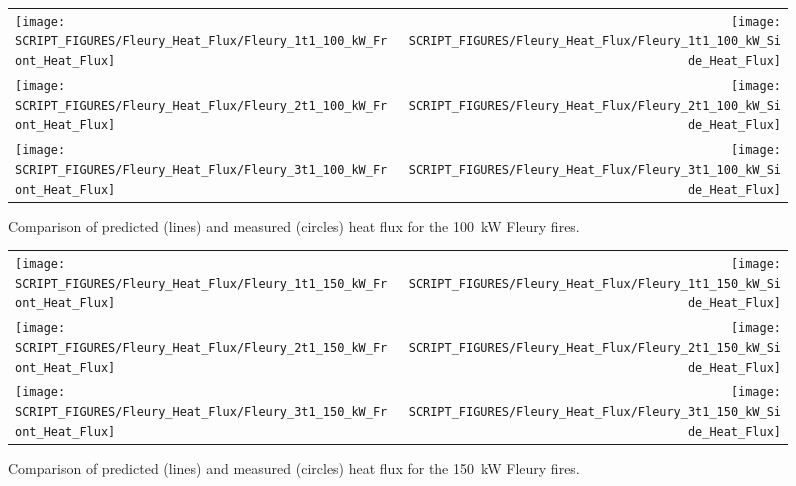 \begin{figure}[p]
\begin{tabular*}{\textwidth}{l@{\extracolsep{\fill}}r}
\texttt{[image: SCRIPT\_FIGURES/Fleury\_Heat\_Flux/Fleury\_1t1\_100\_kW\_Front\_Heat\_Flux]} &
\texttt{[image: SCRIPT\_FIGURES/Fleury\_Heat\_Flux/Fleury\_1t1\_100\_kW\_Side\_Heat\_Flux]} \\
\texttt{[image: SCRIPT\_FIGURES/Fleury\_Heat\_Flux/Fleury\_2t1\_100\_kW\_Front\_Heat\_Flux]} &
\texttt{[image: SCRIPT\_FIGURES/Fleury\_Heat\_Flux/Fleury\_2t1\_100\_kW\_Side\_Heat\_Flux]} \\
\texttt{[image: SCRIPT\_FIGURES/Fleury\_Heat\_Flux/Fleury\_3t1\_100\_kW\_Front\_Heat\_Flux]} &
\texttt{[image: SCRIPT\_FIGURES/Fleury\_Heat\_Flux/Fleury\_3t1\_100\_kW\_Side\_Heat\_Flux]}
\end{tabular*}
\label{Fleury_Heat_Flux_100_kW}
\caption[Fleury Heat Flux, 100 kW fires]
{Comparison of predicted (lines) and measured (circles) heat flux for the 100~kW Fleury fires.}
\end{figure}

\begin{figure}[p]
\begin{tabular*}{\textwidth}{l@{\extracolsep{\fill}}r}
\texttt{[image: SCRIPT\_FIGURES/Fleury\_Heat\_Flux/Fleury\_1t1\_150\_kW\_Front\_Heat\_Flux]} &
\texttt{[image: SCRIPT\_FIGURES/Fleury\_Heat\_Flux/Fleury\_1t1\_150\_kW\_Side\_Heat\_Flux]} \\
\texttt{[image: SCRIPT\_FIGURES/Fleury\_Heat\_Flux/Fleury\_2t1\_150\_kW\_Front\_Heat\_Flux]} &
\texttt{[image: SCRIPT\_FIGURES/Fleury\_Heat\_Flux/Fleury\_2t1\_150\_kW\_Side\_Heat\_Flux]} \\
\texttt{[image: SCRIPT\_FIGURES/Fleury\_Heat\_Flux/Fleury\_3t1\_150\_kW\_Front\_Heat\_Flux]} &
\texttt{[image: SCRIPT\_FIGURES/Fleury\_Heat\_Flux/Fleury\_3t1\_150\_kW\_Side\_Heat\_Flux]}
\end{tabular*}
\label{Fleury_Heat_Flux_150_kW}
\caption[Fleury Heat Flux, 150 kW fires]
{Comparison of predicted (lines) and measured (circles) heat flux for the 150~kW Fleury fires.}
\end{figure}

